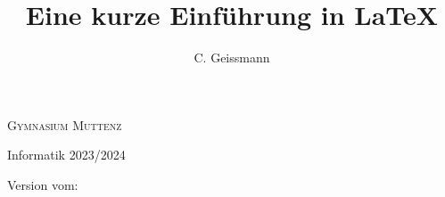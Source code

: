 \documentclass{article}
\title{Eine kurze Einführung in \LaTeX}
\author{C. Geissmann}
\begin{document}
\begin{titlepage}
    \makeatletter %
	\begin{center}
		{\scshape Gymnasium Muttenz} \vspace{0.5cm}

		 Informatik 2023/2024\vspace{5.5cm}

		{\huge\bfseries \@title}

		\vspace{2cm}

		{\Large\itshape \@author}

        \vspace{2cm}

        Version vom: \@date
	\end{center}
    
    \makeatother %
\end{titlepage}
\newpage

\setcounter{page}{1} %
\tableofcontents %
\clearpage %


 \newpage
 \newpage
 \newpage
 \newpage
 \newpage
 \newpage
 \newpage
\end{document}
